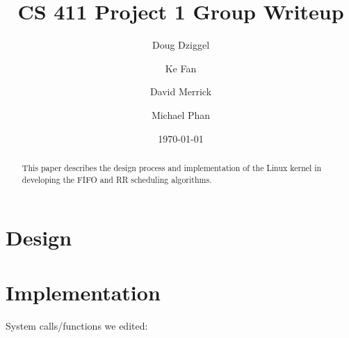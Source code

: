 \documentclass[letterpaper,10pt,titlepage]{article}
\begin{document}
\title{CS 411 Project 1 Group Writeup}
\author{Doug Dziggel \and Ke Fan \and David Merrick \and Michael Phan}
\date{\today}
\maketitle

\begin{abstract}
This paper describes the design process and implementation of the Linux kernel in developing the FIFO and RR scheduling algorithms.
\end{abstract}

\section{Design}


\section{Implementation}

System calls/functions we edited:\\
\end{document}
